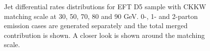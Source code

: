 \begin{figure}[h!]
{	}
	\hfill
	\hfill
  \caption{Jet differential rates distributions for EFT D5 sample with CKKW matching scale at 30, 50, 70, 80 and 90 GeV. 0-, 1- and 2-parton emission cases are generated separately and the total merged contribution is shown. A closer look is shown around the matching scale.}
  \label{fig:CKKW_D5_zoom}
\end{figure}


